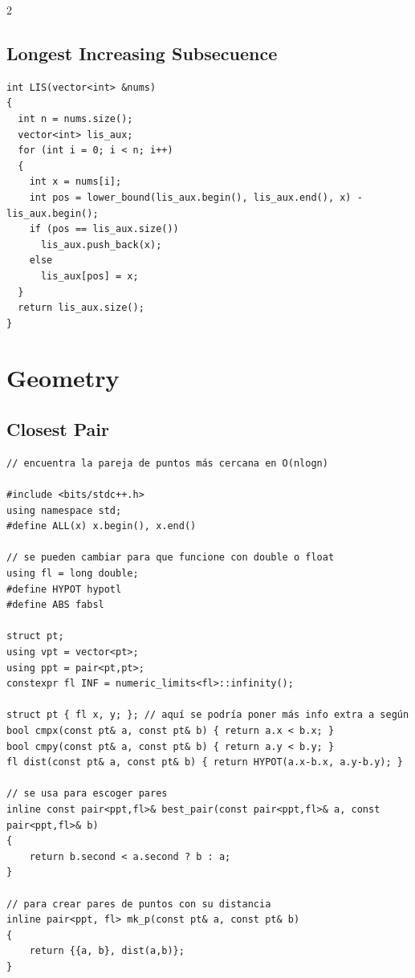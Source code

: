 \documentclass[twoside]{article}
\begin{document}
\begin{multicols*}{2}
	{
		\subsection*{Longest Increasing Subsecuence}
	}
	\begin{verbatim}
int LIS(vector<int> &nums)
{
  int n = nums.size();
  vector<int> lis_aux;
  for (int i = 0; i < n; i++)
  {
    int x = nums[i];
    int pos = lower_bound(lis_aux.begin(), lis_aux.end(), x) - lis_aux.begin();
    if (pos == lis_aux.size())
      lis_aux.push_back(x);
    else
      lis_aux[pos] = x;
  }
  return lis_aux.size(); 
}
\end{verbatim}

	{
		\section*{Geometry}
	}
	{
		\subsection*{Closest Pair}
	}
	\begin{verbatim}
// encuentra la pareja de puntos más cercana en O(nlogn)

#include <bits/stdc++.h>
using namespace std;
#define ALL(x) x.begin(), x.end()

// se pueden cambiar para que funcione con double o float
using fl = long double;
#define HYPOT hypotl
#define ABS fabsl

struct pt;
using vpt = vector<pt>;
using ppt = pair<pt,pt>;
constexpr fl INF = numeric_limits<fl>::infinity();

struct pt { fl x, y; }; // aquí se podría poner más info extra a según
bool cmpx(const pt& a, const pt& b) { return a.x < b.x; }
bool cmpy(const pt& a, const pt& b) { return a.y < b.y; }
fl dist(const pt& a, const pt& b) { return HYPOT(a.x-b.x, a.y-b.y); }

// se usa para escoger pares
inline const pair<ppt,fl>& best_pair(const pair<ppt,fl>& a, const pair<ppt,fl>& b)
{
    return b.second < a.second ? b : a;
}

// para crear pares de puntos con su distancia
inline pair<ppt, fl> mk_p(const pt& a, const pt& b)
{
    return {{a, b}, dist(a,b)};
}


\end{verbatim}
\end{multicols*}
\end{document}
